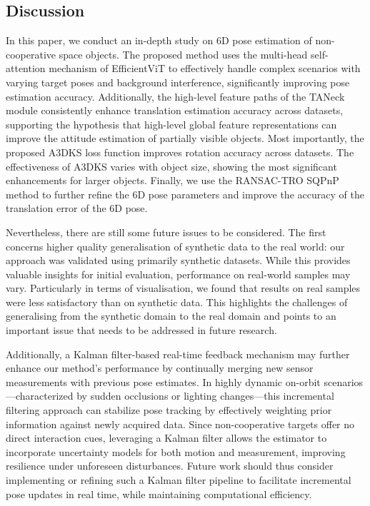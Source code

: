 \documentclass[a4paper,fleqn]{cas-sc}
\begin{document}
\subsection{Discussion}
In this paper, we conduct an in-depth study on 6D pose estimation of non-cooperative space objects. 
The proposed method uses the multi-head self-attention mechanism of EfficientViT 
to effectively handle complex scenarios with varying target poses and background interference, 
significantly improving pose estimation accuracy. Additionally, the high-level feature paths 
of the TANeck module consistently enhance translation estimation accuracy across datasets, 
supporting the hypothesis that high-level global feature representations can improve the 
attitude estimation of partially visible objects. Most importantly, the proposed A3DKS loss 
function improves rotation accuracy across datasets. The effectiveness of A3DKS varies with 
object size, showing the most significant enhancements for larger objects. Finally, we use 
the RANSAC-TRO SQPnP method to further refine the 6D pose parameters and improve the accuracy 
of the translation error of the 6D pose.

Nevertheless, there are still some future issues to be considered. The first concerns higher 
quality generalisation of synthetic data to the real world: our approach was validated using 
primarily synthetic datasets. While this provides valuable insights for initial evaluation, 
performance on real-world samples may vary. Particularly in terms of visualisation, we found 
that results on real samples were less satisfactory than on synthetic data. This highlights 
the challenges of generalising from the synthetic domain to the real domain and points to an 
important issue that needs to be addressed in future research. 


Additionally, a Kalman filter-based real-time feedback mechanism may further enhance 
our method’s performance by continually merging new sensor measurements with previous pose 
estimates. In highly dynamic on-orbit scenarios—characterized by sudden occlusions or 
lighting changes—this incremental filtering approach can stabilize pose tracking by effectively 
weighting prior information against newly acquired data. Since non-cooperative targets offer 
no direct interaction cues, leveraging a Kalman filter allows the estimator to incorporate 
uncertainty models for both motion and measurement, improving resilience under unforeseen 
disturbances. Future work should thus consider implementing or refining such a Kalman 
filter pipeline to facilitate incremental pose updates in real time, while maintaining 
computational efficiency.
\end{document}
